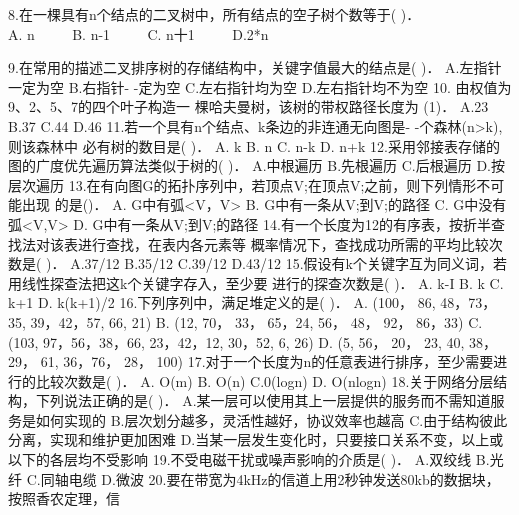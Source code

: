 8.在一棵具有n个结点的二叉树中，所有结点的空子树个数等于(    )． \\
A. n $\qquad$ B. n-1 $\qquad$ C. n十1 $\qquad$ D.2*n

9.在常用的描述二叉排序树的存储结构中，关键字值最大的结点是( )．
A.左指针一定为空
B.右指针- -定为空
C.左右指针均为空
D.左右指针均不为空
10. 由权值为9、2、5、7的四个叶子构造一 棵哈夫曼树，该树的带权路径长度为
(1)．
A.23
B.37
C.44
D.46
11.若一个具有n个结点、k条边的非连通无向图是- -个森林(n>k), 则该森林中
必有树的数目是( )．
A. k
B. n
C. n-k
D. n+k
12.采用邻接表存储的图的广度优先遍历算法类似于树的( )．
A.中根遍历
B.先根遍历
C.后根遍历
D.按层次遍历
13.在有向图G的拓扑序列中，若顶点V;在顶点V;之前，则下列情形不可能出现
的是()．
A. G中有弧<V，V>
B. G中有一条从V;到V;的路径
C. G中没有弧<V,V>
D. G中有一条从V;到V;的路径
14.有一个长度为12的有序表，按折半查找法对该表进行查找，在表内各元素等
概率情况下，查找成功所需的平均比较次数是( )．
A.37/12
B.35/12
C.39/12
D.43/12
15.假设有k个关键字互为同义词，若用线性探查法把这k个关键字存入，至少要
进行的探查次数是( )．
A. k-I
B. k
C. k+1
D. k(k+1)/2
16.下列序列中，满足堆定义的是( )．
A. (100， 86, 48，73，35, 39，42，57, 66, 21)
B. (12, 70， 33， 65，24, 56， 48， 92， 86，33)
C. (103, 97，56，38，66, 23，42，12, 30，52, 6, 26)
D. (5, 56， 20， 23, 40, 38， 29， 61, 36，76， 28， 100)
17.对于一个长度为n的任意表进行排序，至少需要进行的比较次数是( )．
A. O(m)
B. O(n)
C.0(logn)
D. O(nlogn)
18.关于网络分层结构，下列说法正确的是( )．
A.某一层可以使用其上一层提供的服务而不需知道服务是如何实现的
B.层次划分越多，灵活性越好，协议效率也越高
C.由于结构彼此分离，实现和维护更加困难
D.当某一层发生变化时，只要接口关系不变，以上或以下的各层均不受影响
19.不受电磁干扰或噪声影响的介质是( )．
A.双绞线
B.光纤
C.同轴电缆
D.微波
20.要在带宽为4kHz的信道上用2秒钟发送80kb的数据块，按照香农定理，信
